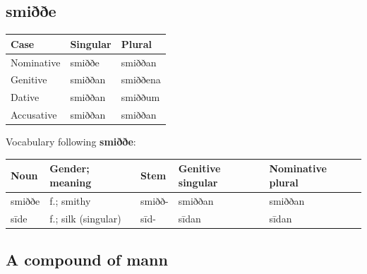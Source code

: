 \subsection*{smiððe}

\par\begingroup
\fontsize{10.5}{13.2}\selectfont
\setlength{\LTleft}{0pt}\setlength{\LTright}{\fill}
\noindent
\begin{tabular}{@{}>{\raggedright\arraybackslash}p{39.46mm}>{\raggedright\arraybackslash}p{39.46mm}>{\raggedright\arraybackslash}p{39.46mm}@{}}
\toprule
\textbf{Case} & \textbf{Singular} & \textbf{Plural} \\
\midrule
Nominative & smiððe & smiððan \\
Genitive & smiððan & smiððena \\
Dative & smiððan & smiððum \\
Accusative & smiððan & smiððan \\
\bottomrule
\end{tabular}
\par\endgroup

Vocabulary following \textbf{smiððe}:

\par\begingroup
\fontsize{10.5}{13.2}\selectfont
\setlength{\LTleft}{0pt}\setlength{\LTright}{\fill}
\noindent
\begin{tabular}{@{}>{\raggedright\arraybackslash}p{19.03mm}>{\raggedright\arraybackslash}p{26.74mm}>{\raggedright\arraybackslash}p{19.03mm}>{\raggedright\arraybackslash}p{22.93mm}>{\raggedright\arraybackslash}p{25.02mm}@{}}
\toprule
\textbf{Noun} & \textbf{Gender; meaning} & \textbf{Stem} & \textbf{Genitive singular} & \textbf{Nominative plural} \\
\midrule
smiððe & f.; smithy & smiðð- & smiððan & smiððan \\
sīde & f.; silk (singular) & sīd- & sīdan & sīdan \\
\bottomrule
\end{tabular}
\par\endgroup

\subsection*{A compound of mann}

